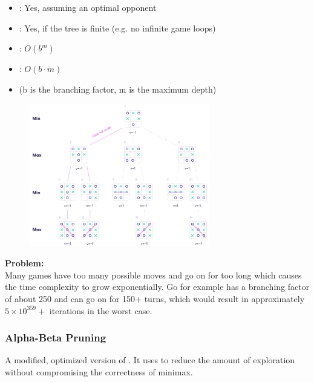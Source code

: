 \documentclass[
../../EiKI_Summary.tex,
]
{subfiles}
\begin{document}
\begin{defbox}
    [Characteristics]
    \begin{itemize}
        \item {}: Yes, assuming an optimal opponent
        \item {}: Yes, if the tree is finite (e.g. no infinite game loops)
        \item {}: $O(b^m)$
        \item {}: $O(b\cdot m)$
        \item (b is the branching factor, m is the maximum depth)
    \end{itemize}
\end{defbox}

\begin{figure}[H]
    \centering
    \includegraphics[width=0.7\textwidth]{Pics/04/MinimaxEx.png}
\end{figure}

\textbf{Problem:}\\
Many games have too many possible moves and go on for too long which causes the time complexity to grow exponentially. Go for example has a branching factor of about 250 and can go on for 150+ turns, which would result in approximately $5\times 10^{359} +$ iterations in the worst case. 

\subsubsection{Alpha-Beta Pruning}
\begin{defbox*}
    A modified, optimized version of . It uses  to reduce the amount of exploration without compromising the correctness of minimax.
\end{defbox*}
\end{document}
